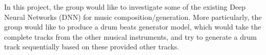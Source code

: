 \begin{par}
    \par \hspace{15pt} In this project, the group would like to investigate some of the existing Deep Neural Networks (DNN) for music composition/generation. More particularly, the group would like to produce a drum beats generator model, which would take the complete tracks from the other musical instruments, and try to generate a drum track sequentially based on these provided other tracks. 
    
\end{par}